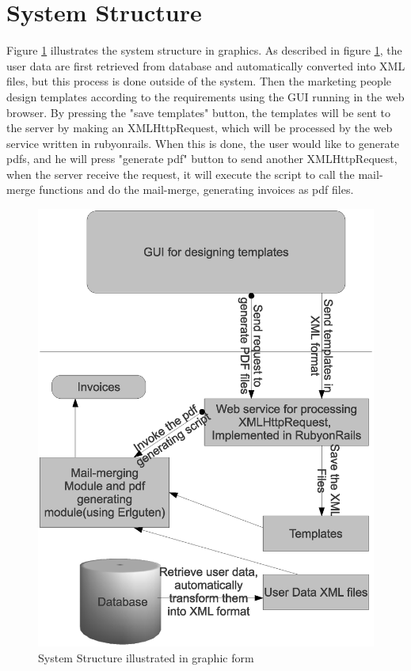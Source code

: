 \documentclass{report}
\begin{document}
\section{System Structure}
  Figure \ref{fig1} illustrates the system structure in graphics. As described in figure \ref{fig1}, the user data are first retrieved from database and automatically converted into XML files, but this process is done outside of the system. Then the marketing people design templates according to the requirements using the GUI running in the web browser. By pressing the "save templates" button, the templates will be sent to the server by making an XMLHttpRequest, which will be processed by the web service written in rubyonrails. When this is done, the user would like to generate pdfs, and he will press "generate pdf" button to send another XMLHttpRequest, when the server receive the request, it will execute the script to call the mail-merge functions and do the mail-merge, generating invoices as pdf files. 

\begin{figure}[p]
\centering
\includegraphics[scale=0.5]{systemstructure.eps}
\caption{System Structure illustrated in graphic form}
\label{fig1}
\end{figure}
\end{document}
